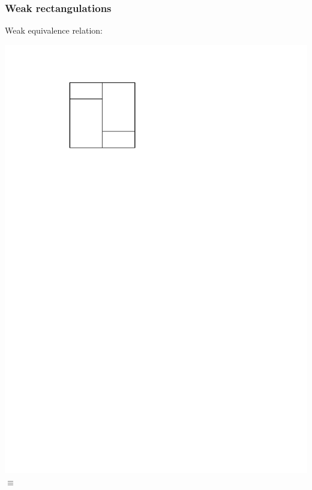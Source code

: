 \documentclass[11pt]{beamer}%
\begin{document}
\begin{frame}
  \frametitle{Weak rectangulations}
  Weak equivalence relation:
    \begin{center}
      \includegraphics[page=1,height=.1\textheight]{figures.pdf} $\equiv$ 

\end{center}
\end{frame}
\end{document}
